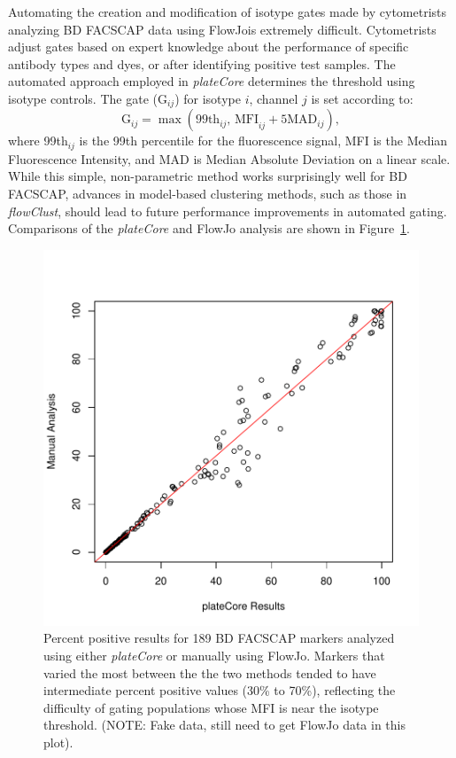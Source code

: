 \documentclass[12pt]{article}
\newcommand{\Rpackage}[1]{{\textit{#1}}}
\begin{document}
Automating the creation and modification of isotype gates made by cytometrists analyzing BD FACS\texttrademark CAP data
using FlowJo\texttrademark is extremely difficult. Cytometrists adjust gates based on expert knowledge about the performance of 
specific antibody types and dyes, or after identifying positive test samples. The automated approach
employed in \Rpackage{plateCore} determines the threshold using isotype controls.  The gate (G$_{ij}$) for isotype $i$, channel $j$
is set according to:
\begin{equation}
\text{G}_{ij} = \max (\text{99th}_{ij} \text{, MFI}_{ij}+ 5 \text{MAD}_{ij}),
\label{isoGate}
\end{equation}
where 99th$_{ij}$ is the 99th percentile for the fluorescence signal,
MFI is the Median Fluorescence Intensity, and MAD is Median Absolute Deviation
on a linear scale. While this simple, non-parametric method works surprisingly well for BD FACS\texttrademark CAP,
advances in model-based clustering methods, such as those in \Rpackage{flowClust}, should lead
to future performance improvements in automated gating. Comparisons of the \Rpackage{plateCore} and FlowJo\texttrademark 
analysis are shown in Figure~\ref{fig:pcVSman}.

\clearpage
\begin{figure}
\centering
\includegraphics{outline-pcVSman}
\caption{Percent positive results for 189 BD FACS\textrademark CAP markers analyzed using either \Rpackage{plateCore}
or manually using FlowJo\texttrademark. Markers that varied the most between the the two methods tended to have
intermediate percent positive values (30\% to 70\%), reflecting the difficulty of gating populations whose MFI is 
near the isotype threshold. (NOTE: Fake data, still need to get FlowJo data in this plot).
}
\label{fig:pcVSman}
\end{figure}
\end{document}
